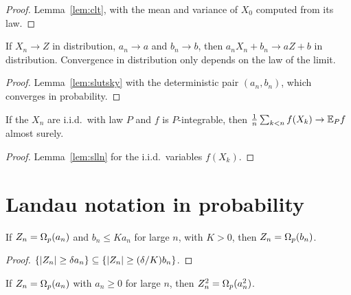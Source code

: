 \begin{proof}
  \leanok
  Lemma~\ref{lem:clt}, with the mean and variance of $X_0$ computed from its law.
\end{proof}

\begin{lemma}
  \label{lem:slutsky_det}
  \leanok
  If $X_n \to Z$ in distribution, $a_n \to a$ and $b_n \to b$, then $a_n X_n + b_n \to aZ + b$ in
  distribution. Convergence in distribution only depends on the law of the limit.
\end{lemma}

\begin{proof}
  \leanok
  Lemma~\ref{lem:slutsky} with the deterministic pair $(a_n, b_n)$, which converges in probability.
\end{proof}

\begin{lemma}
  \label{lem:slln_hasLaw}
  \leanok
  If the $X_n$ are i.i.d.\ with law $P$ and $f$ is $P$-integrable, then
  $\frac1n \sum_{k<n} f(X_k) \to \mathbb{E}_P f$ almost surely.
\end{lemma}

\begin{proof}
  \leanok
  Lemma~\ref{lem:slln} for the i.i.d.\ variables $f(X_k)$.
\end{proof}

\section{Landau notation in probability}

\begin{lemma}
  \label{lem:isBigOmegaInProb_mono}
  \leanok
  If $Z_n = \Omega_p(a_n)$ and $b_n \le K a_n$ for large $n$, with $K > 0$, then $Z_n = \Omega_p(b_n)$.
\end{lemma}

\begin{proof}
  \leanok
  $\{\lvert Z_n \rvert \ge \delta a_n\} \subseteq \{\lvert Z_n \rvert \ge (\delta/K) b_n\}$.
\end{proof}

\begin{lemma}
  \label{lem:isBigOmegaInProb_sq}
  \leanok
  If $Z_n = \Omega_p(a_n)$ with $a_n \ge 0$ for large $n$, then $Z_n^2 = \Omega_p(a_n^2)$.
\end{lemma}

